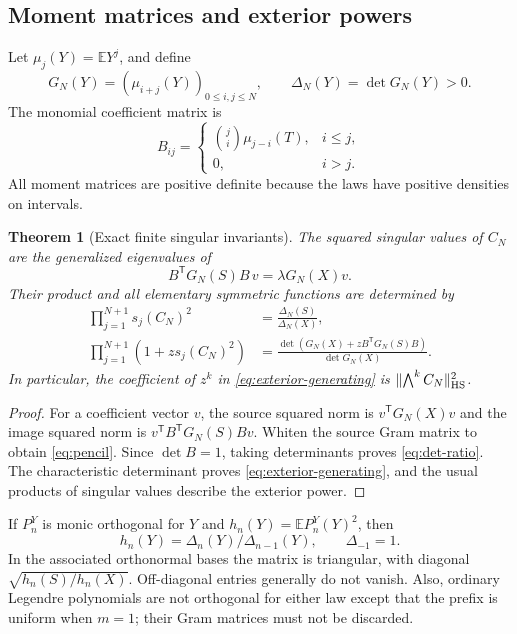 \documentclass[11pt,a4paper]{article}
\numberwithin{equation}{section}
\newtheorem{theorem}{Theorem}[section]
\theoremstyle{definition}\newtheorem{definition}[theorem]{Definition}
\theoremstyle{remark}\newtheorem{remark}[theorem]{Remark}
\newcommand{\E}{\mathbb E}\newcommand{\Pp}{\mathbb P}
\newcommand{\norm}[1]{\lVert #1\rVert}
\begin{document}
\subsection{Moment matrices and exterior powers}
Let $\mu_j(Y)=\E Y^j$, and define
\begin{equation}
 G_N(Y)=(\mu_{i+j}(Y))_{0\le i,j\le N},\qquad
 \Delta_N(Y)=\det G_N(Y)>0.
 \label{eq:moment-gram}
\end{equation}
The monomial coefficient matrix is
\begin{equation}
 B_{ij}=\begin{cases}\binom ji\mu_{j-i}(T),&i\le j,\\0,&i>j.\end{cases}
 \label{eq:B}
\end{equation}
All moment matrices are positive definite because the laws have positive densities on intervals.
\begin{theorem}[Exact finite singular invariants]
\label{thm:det}
The squared singular values of $C_N$ are the generalized eigenvalues of
\begin{equation}
 B^{\mathsf T}G_N(S)B\,v=\lambda G_N(X)v.
 \label{eq:pencil}
\end{equation}
Their product and all elementary symmetric functions are determined by
\begin{align}
 \prod_{j=1}^{N+1}s_j(C_N)^2
 &=\frac{\Delta_N(S)}{\Delta_N(X)},\label{eq:det-ratio}\\
 \prod_{j=1}^{N+1}(1+z s_j(C_N)^2)
 &=\frac{\det(G_N(X)+zB^{\mathsf T}G_N(S)B)}{\det G_N(X)}.
 \label{eq:exterior-generating}
\end{align}
In particular, the coefficient of $z^k$ in \eqref{eq:exterior-generating} is $\norm{\bigwedge^k C_N}_{\HS}^2$.
\end{theorem}
\begin{proof}
For a coefficient vector $v$, the source squared norm is $v^{\mathsf T}G_N(X)v$ and the image squared norm is $v^{\mathsf T}B^{\mathsf T}G_N(S)Bv$. Whiten the source Gram matrix to obtain \eqref{eq:pencil}. Since $\det B=1$, taking determinants proves \eqref{eq:det-ratio}. The characteristic determinant proves \eqref{eq:exterior-generating}, and the usual products of singular values describe the exterior power.
\end{proof}
If $P_n^Y$ is monic orthogonal for $Y$ and $h_n(Y)=\E P_n^Y(Y)^2$, then
\[
 h_n(Y)=\Delta_n(Y)/\Delta_{n-1}(Y),\qquad\Delta_{-1}=1.
\]
In the associated orthonormal bases the matrix is triangular, with diagonal $\sqrt{h_n(S)/h_n(X)}$. Off-diagonal entries generally do not vanish. Also, ordinary Legendre polynomials are not orthogonal for either law except that the prefix is uniform when $m=1$; their Gram matrices must not be discarded.
\end{document}
